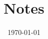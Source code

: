 \documentclass[
    aps,
    prd,
    reprint,
    linenumbers,
    nolongbibliography,
    nobibnotes,
    nofootinbib,
    onecolumn
]{revtex4-2}
\begin{document}
\title{Notes}
\date{\today}
\maketitle
\end{document}
